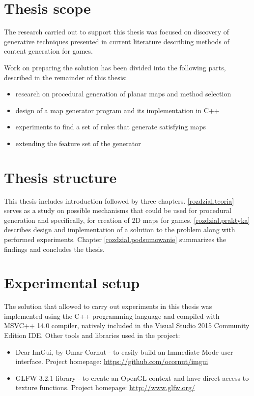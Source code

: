 \documentclass[12pt]{report}
\begin{document}
\section{Thesis scope}

The research carried out to support this thesis was focused on discovery of generative techniques presented in current literature describing methods of content generation for games. 

Work on preparing the solution has been divided into the following parts, described in the remainder of this thesis:

\begin{itemize}
	\item research on procedural generation of planar maps and method selection
	\item design of a map generator program and its implementation in C++
	\item experiments to find a set of rules that generate satisfying maps
	\item extending the feature set of the generator
\end{itemize} 

\section{Thesis structure}
This thesis includes introduction followed by three chapters. \cref{rozdzial.teoria} serves as a study on possible mechanisms that could be used for procedural generation and specifically, for creation of 2D maps for games. \cref{rozdzial.praktyka} describes design and implementation of a solution to the problem along with performed experiments. Chapter \cref{rozdzial.podsumowanie} summarizes the findings and concludes the thesis.

\section{Experimental setup}

The solution that allowed to carry out experiments in this thesis was implemented using the C++ programming language and compiled with MSVC++ 14.0 compiler, natively included in the Visual Studio 2015 Community Edition IDE. Other tools and libraries used in the project:

\begin{itemize}
	\item Dear ImGui, by Omar Cornut - to easily build an Immediate Mode user interface. Project homepage:  \url{https://github.com/ocornut/imgui}
	\item GLFW 3.2.1 library - to create an OpenGL context and have direct access to texture functions. Project homepage: \url{http://www.glfw.org/}  
\end{itemize}  
\end{document}
